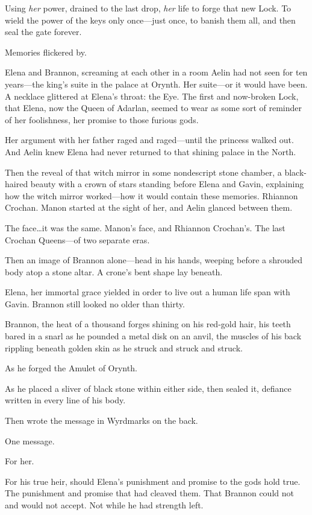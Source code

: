 Using \emph{her} power, drained to the last drop, \emph{her} life to forge that new Lock.
To wield the power of the keys only once---just once, to banish them all, and then seal the gate forever.

Memories flickered by.

Elena and Brannon, screaming at each other in a room Aelin had not seen for ten years---the king's suite in the palace at Orynth.
Her suite---or it would have been.
A necklace glittered at Elena's throat: the Eye.
The first and now-broken Lock, that Elena, now the Queen of Adarlan, seemed to wear as some sort of reminder of her foolishness, her promise to those furious gods.

Her argument with her father raged and raged---until the princess walked out.
And Aelin knew Elena had never returned to that shining palace in the North.

Then the reveal of that witch mirror in some nondescript stone chamber, a black-haired beauty with a crown of stars standing before Elena and Gavin, explaining how the witch mirror worked---how it would contain these memories.
Rhiannon Crochan.
Manon started at the sight of her, and Aelin glanced between them.

The face\ldots it was the same.
Manon's face, and Rhiannon Crochan's.
The last Crochan Queens---of two separate eras.

Then an image of Brannon alone---head in his hands, weeping before a shrouded body atop a stone altar.
A crone's bent shape lay beneath.

Elena, her immortal grace yielded in order to live out a human life span with Gavin.
Brannon still looked no older than thirty.

Brannon, the heat of a thousand forges shining on his red-gold hair, his teeth bared in a snarl as he pounded a metal disk on an anvil, the muscles of his back rippling beneath golden skin as he struck and struck and struck.

As he forged the Amulet of Orynth.

As he placed a sliver of black stone within either side, then sealed it, defiance written in every line of his body.

Then wrote the message in Wyrdmarks on the back.

One message.

For her.

For his true heir, should Elena's punishment and promise to the gods hold true.
The punishment and promise that had cleaved them.
That Brannon could not and would not accept.
Not while he had strength left.

